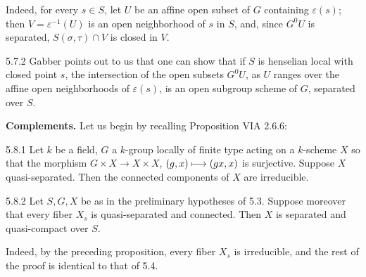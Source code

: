 Indeed, for every $s\in S$, let $U$ be an affine open subset of $G$ containing $\varepsilon(s)$; then $V=\varepsilon^{-1}(U)$ is an open neighborhood of $s$ in $S$, and, since $G^0U$ is separated, $S(\sigma,\tau)\cap V$ is closed in $V$.
\begin{remark}{5.7.2}\label{VIB.5.7.2}
Gabber points out to us that one can show that if $S$ is henselian local with closed point $s$, the intersection of the open subsets $G^0U$, as $U$ ranges over the affine open neighborhoods of $\varepsilon(s)$, is an open subgroup scheme of $G$, separated over $S$.
\end{remark}
\textbf{Complements.} Let us begin by recalling Proposition VIA 2.6.6:
\begin{proposition}{5.8.1}\label{VIB.5.8.1}
Let $k$ be a field, $G$ a $k$-group locally of finite type acting on a $k$-scheme $X$ so that the morphism $G\times X\to X\times X$, $(g,x)\longmapsto(gx,x)$ is surjective. Suppose $X$ quasi-separated. Then the connected components of $X$ are irreducible.
\end{proposition}
\begin{corollary}{5.8.2}\label{VIB.5.8.2}
Let $S,G,X$ be as in the preliminary hypotheses of 5.3. Suppose moreover that every fiber $X_s$ is quasi-separated and connected. Then $X$ is separated and quasi-compact over $S$.
\end{corollary}
Indeed, by the preceding proposition, every fiber $X_s$ is irreducible, and the rest of the proof is identical to that of 5.4.

